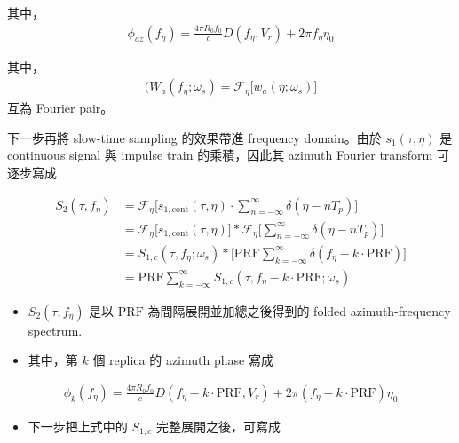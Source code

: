 \documentclass[10pt]{article}
\providecommand{\tightlist}{%
  \setlength{\itemsep}{0pt}\setlength{\parskip}{0pt}}
\begin{document}
其中，
\begin{equation}
\begin{aligned}
\phi_{az}(f_\eta) = \frac{4\pi R_0f_0}{c}D(f_\eta,V_r)+2\pi f_\eta\eta_0
\end{aligned}
\end{equation}

其中，
\begin{equation}
\begin{aligned}(W_a(f_\eta;\omega_s) = \mathcal{F}_{\eta}\biggl[ w_a(\eta;\omega_s) \biggr]
\end{aligned}
\end{equation}
互為 Fourier pair。

下一步再將 slow-time sampling 的效果帶進 frequency domain。由於
\(s_1(\tau,\eta)\) 是 continuous signal 與 impulse train
的乘積，因此其 azimuth Fourier transform 可逐步寫成


\begin{equation}
\begin{aligned}
S_{2}(\tau,f_\eta)
&= \mathcal{F}_{\eta}\biggl[ s_{1,\mathrm{cont}}(\tau,\eta)\cdot \sum_{n=-\infty}^{\infty}\delta(\eta-nT_p) \biggr] \\
&= \mathcal{F}_{\eta}\biggl[ s_{1,\mathrm{cont}}(\tau,\eta) \biggr]\ast \mathcal{F}_{\eta}\biggl[ \sum_{n=-\infty}^{\infty}\delta(\eta-nT_p) \biggr] \\
&= S_{1,c}(\tau,f_\eta;\omega_s)\ast \biggl[ \mathrm{PRF}\sum_{k=-\infty}^{\infty}\delta(f_\eta-k\cdot\mathrm{PRF}) \biggr] \\
&= \mathrm{PRF}\sum_{k=-\infty}^{\infty} S_{1,c}(\tau,f_\eta-k\cdot\mathrm{PRF};\omega_s)
\end{aligned}
\end{equation}

\begin{itemize}
\item
  \(S_{2}(\tau,f_\eta)\) 是以 \(\mathrm{PRF}\)
  為間隔展開並加總之後得到的 folded azimuth-frequency spectrum.
\item
  其中，第 \(k\) 個 replica 的 azimuth phase 寫成
\end{itemize}

\begin{equation}
\begin{aligned} \phi_k(f_\eta) = \frac{4\pi R_0f_0}{c}D(f_\eta-k\cdot\mathrm{PRF},V_r) + 2\pi(f_\eta-k\cdot\mathrm{PRF})\eta_0 \end{aligned}
\end{equation}

\begin{itemize}
\tightlist
\item
  下一步把上式中的 \(S_{1,c}\) 完整展開之後，可寫成
\end{itemize}
\end{document}
